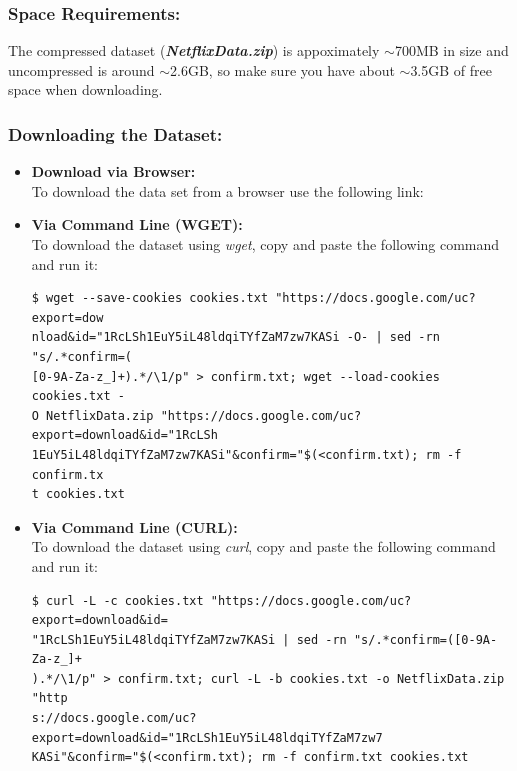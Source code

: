 \documentclass{article}
\begin{document}
\subsubsection*{Space Requirements:}
The compressed dataset (\textbf{\textit{NetflixData.zip}}) is appoximately $\sim$700MB in size and uncompressed is around $\sim$2.6GB, so make sure you have about $\sim$3.5GB of free space when downloading.


\subsubsection*{Downloading the Dataset:}
\begin{itemize}
    \item \textbf{Download via Browser:}\\
        To download the data set from a browser use the following link:
        \begin{center}
        \href{https://drive.google.com/uc?export=download&id=1RcLSh1EuY5iL48ldqiTYfZaM7zw7KASi}{\color{blue}{https://drive.google.com/uc?export=download\&id=1RcLSh1EuY5iL48ldqiTYfZaM7zw7KASi}}
        \end{center}
    \item \textbf{Via Command Line (WGET):}\\
        To download the dataset using \textit{wget}, copy and paste the following command and run it:
        \begin{commandline}\begin{verbatim}$ wget --save-cookies cookies.txt "https://docs.google.com/uc?export=dow
nload&id="1RcLSh1EuY5iL48ldqiTYfZaM7zw7KASi -O- | sed -rn "s/.*confirm=(
[0-9A-Za-z_]+).*/\1/p" > confirm.txt; wget --load-cookies cookies.txt -
O NetflixData.zip "https://docs.google.com/uc?export=download&id="1RcLSh
1EuY5iL48ldqiTYfZaM7zw7KASi"&confirm="$(<confirm.txt); rm -f confirm.tx
t cookies.txt\end{verbatim}\end{commandline}
    \item \textbf{Via Command Line (CURL):}\\
        To download the dataset using \textit{curl}, copy and paste the following command and run it:
        \begin{commandline}\begin{verbatim}$ curl -L -c cookies.txt "https://docs.google.com/uc?export=download&id=
"1RcLSh1EuY5iL48ldqiTYfZaM7zw7KASi | sed -rn "s/.*confirm=([0-9A-Za-z_]+
).*/\1/p" > confirm.txt; curl -L -b cookies.txt -o NetflixData.zip "http
s://docs.google.com/uc?export=download&id="1RcLSh1EuY5iL48ldqiTYfZaM7zw7
KASi"&confirm="$(<confirm.txt); rm -f confirm.txt cookies.txt\end{verbatim}
\end{commandline}
\end{itemize}
\end{document}
